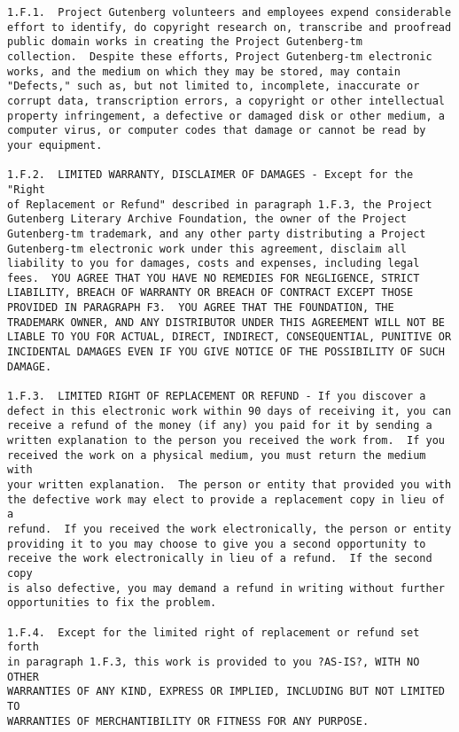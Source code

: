 \begin{Verbatim}[fontsize=\footnotesize]
1.F.1.  Project Gutenberg volunteers and employees expend considerable
effort to identify, do copyright research on, transcribe and proofread
public domain works in creating the Project Gutenberg-tm
collection.  Despite these efforts, Project Gutenberg-tm electronic
works, and the medium on which they may be stored, may contain
"Defects," such as, but not limited to, incomplete, inaccurate or
corrupt data, transcription errors, a copyright or other intellectual
property infringement, a defective or damaged disk or other medium, a
computer virus, or computer codes that damage or cannot be read by
your equipment.

1.F.2.  LIMITED WARRANTY, DISCLAIMER OF DAMAGES - Except for the "Right
of Replacement or Refund" described in paragraph 1.F.3, the Project
Gutenberg Literary Archive Foundation, the owner of the Project
Gutenberg-tm trademark, and any other party distributing a Project
Gutenberg-tm electronic work under this agreement, disclaim all
liability to you for damages, costs and expenses, including legal
fees.  YOU AGREE THAT YOU HAVE NO REMEDIES FOR NEGLIGENCE, STRICT
LIABILITY, BREACH OF WARRANTY OR BREACH OF CONTRACT EXCEPT THOSE
PROVIDED IN PARAGRAPH F3.  YOU AGREE THAT THE FOUNDATION, THE
TRADEMARK OWNER, AND ANY DISTRIBUTOR UNDER THIS AGREEMENT WILL NOT BE
LIABLE TO YOU FOR ACTUAL, DIRECT, INDIRECT, CONSEQUENTIAL, PUNITIVE OR
INCIDENTAL DAMAGES EVEN IF YOU GIVE NOTICE OF THE POSSIBILITY OF SUCH
DAMAGE.

1.F.3.  LIMITED RIGHT OF REPLACEMENT OR REFUND - If you discover a
defect in this electronic work within 90 days of receiving it, you can
receive a refund of the money (if any) you paid for it by sending a
written explanation to the person you received the work from.  If you
received the work on a physical medium, you must return the medium with
your written explanation.  The person or entity that provided you with
the defective work may elect to provide a replacement copy in lieu of a
refund.  If you received the work electronically, the person or entity
providing it to you may choose to give you a second opportunity to
receive the work electronically in lieu of a refund.  If the second copy
is also defective, you may demand a refund in writing without further
opportunities to fix the problem.

1.F.4.  Except for the limited right of replacement or refund set forth
in paragraph 1.F.3, this work is provided to you ?AS-IS?, WITH NO OTHER
WARRANTIES OF ANY KIND, EXPRESS OR IMPLIED, INCLUDING BUT NOT LIMITED TO
WARRANTIES OF MERCHANTIBILITY OR FITNESS FOR ANY PURPOSE.


\end{Verbatim}

